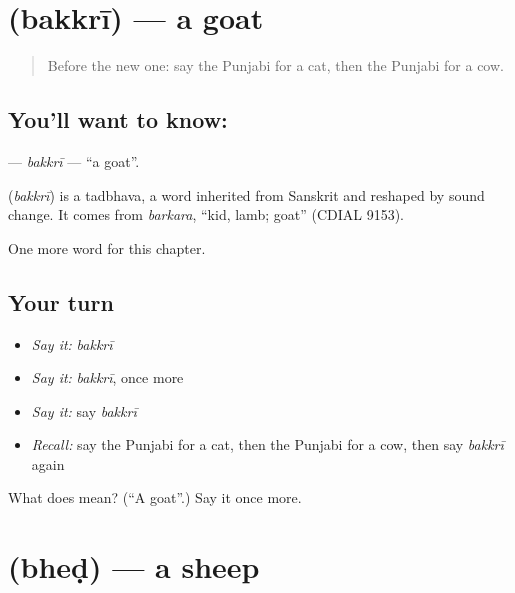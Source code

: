 \section[\texorpdfstring{\pa{ਬੱਕਰੀ} (bakkrī)}{ਬੱਕਰੀ (bakkrī)}]{ (bakkrī) — a goat}

\label{lesson:PA-C77-bakkri}



\begin{quote}
Before the new one: say the Punjabi for a cat, then the Punjabi for a cow.
\end{quote}

\subsection*{You'll want to know: }
\textbf{} — \emph{bakkrī} — \textquotedblleft{}a goat\textquotedblright{}.

\begin{cousinweb}
\textbf{} (\emph{bakkrī}) is a tadbhava, a word inherited from Sanskrit and reshaped by sound change. It comes from \emph{barkara}, \textquotedblleft{}kid, lamb; goat\textquotedblright{} (CDIAL 9153).
\end{cousinweb}

\begin{grammarlens}[title={What you've built}]
One more word for this chapter.
\end{grammarlens}

\subsection*{Your turn}
\begin{itemize}
\raggedright
  \item \emph{Say it:} \emph{bakkrī}
  \item \emph{Say it:} \emph{bakkrī}, once more
  \item \emph{Say it:} say \emph{bakkrī}
  \item \emph{Recall:} say the Punjabi for a cat, then the Punjabi for a cow, then say \emph{bakkrī} again
\end{itemize}

\begin{tcolorbox}[breakable,colback=teal!4,colframe=teal!35!black,title={Before you move on}]
What does  mean? (\textquotedblleft{}A goat\textquotedblright{}.) Say it once more.
\end{tcolorbox}
\section[\texorpdfstring{\pa{ਭੇਡ} (bheḍ)}{ਭੇਡ (bheḍ)}]{ (bheḍ) — a sheep}

